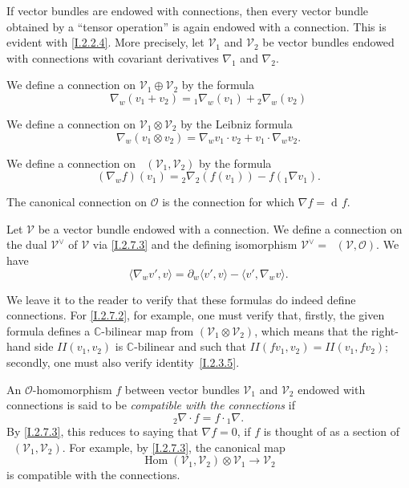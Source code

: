 \documentclass{report}
\theoremstyle{plain}
\theoremstyle{definition}
\newenvironment{env}[1]
    {\renewcommand\theinnercustomenv{#1}\innercustomenv}
    {\endinnercustomenv}
\newcommand{\sh}{\mathscr}
\DeclareMathOperator{\Hom}{Hom}
\DeclareMathOperator{\iHom}{\underline{Hom}}
\DeclareMathOperator{\dd}{d\!}
\newcommand{\oldpage}[1]{\marginpar{\footnotesize$\Big\vert$ \textit{p.~#1}}}
\begin{document}
\begin{env}{2.7}
\label{I.2.7}
  If vector bundles are endowed with connections, then every vector bundle obtained by a ``tensor operation'' is again endowed with a connection.
  This is evident with \cref{I.2.2.4}.
  More precisely, let $\sh{V}_1$ and $\sh{V}_2$ be vector bundles endowed with connections with covariant derivatives $\nabla_1$ and $\nabla_2$.

  \begin{env}{2.7.1}
  \label{I.2.7.1}
    We define a connection on $\sh{V}_1\oplus\sh{V}_2$ by the formula
    \[
      \nabla_w(v_1+v_2) = {}_1\!\nabla_w(v_1) + {}_2\!\nabla_w(v_2)
    \]
  \end{env}

  \begin{env}{2.7.2}
  \label{I.2.7.2}
    We define a connection on $\sh{V}_1\otimes\sh{V}_2$ by the Leibniz formula
    \[
      \nabla_w(v_1\otimes v_2) = \nabla_w v_1\cdot v_2 + v_1\cdot\nabla_w v_2.
    \]
  \end{env}

  \begin{env}{2.7.3}
  \label{I.2.7.3}
    We define a connection on $\iHom(\sh{V}_1,\sh{V}_2)$ by the formula
    \[
      (\nabla_w f)(v_1) = {}_2\!\nabla_2(f(v_1)) - f({}_1\!\nabla v_1).
    \]
  \end{env}

  The canonical connection on $\sh{O}$ is the connection for which $\nabla f=\dd f$.
  
  Let $\sh{V}$ be a vector bundle endowed with a connection.
  \begin{env}{2.7.4}
  \label{I.2.7.4}
    We define a connection on the dual $\sh{V}^\vee$ of $\sh{V}$ via \cref{I.2.7.3} and the defining isomorphism $\sh{V}^\vee = \iHom(\sh{V},\sh{O})$.
    We have
    \[
      \langle \nabla_w v',v \rangle = \partial_w\langle v',v \rangle - \langle v',\nabla_w v \rangle.
    \]
  \end{env}

  We leave it to the reader to verify that these formulas do indeed define connections.
  For \cref{I.2.7.2}, for example, one must verify that, firstly, the given formula defines a $\mathbb{C}$-bilinear map from $(\sh{V}_1\otimes\sh{V}_2)$, which means that the right-hand side $II(v_1,v_2)$ is $\mathbb{C}$-bilinear and such that $II(fv_1,v_2)=II(v_1,fv_2)$;
  secondly, one must also verify identity~\cref{I.2.3.5}.
\end{env}

\begin{env}{2.8}
\label{I.2.8}
  An $\sh{O}$-homomorphism $f$ between vector bundles $\sh{V}_1$ and $\sh{V}_2$ endowed with connections
\oldpage{9}
  is said to be \emph{compatible with the connections} if
  \[
    {}_2\!\nabla\cdot f = f\cdot{}_1\!\nabla.
  \]
  By \cref{I.2.7.3}, this reduces to saying that $\nabla f=0$, if $f$ is thought of as a section of $\iHom(\sh{V}_1,\sh{V}_2)$.
  For example, by \cref{I.2.7.3}, the canonical map
  \[
    \Hom(\sh{V}_1,\sh{V}_2)\otimes\sh{V}_1 \to \sh{V}_2
  \]
  is compatible with the connections.
\end{env}



\nocite{*}

\end{document}

